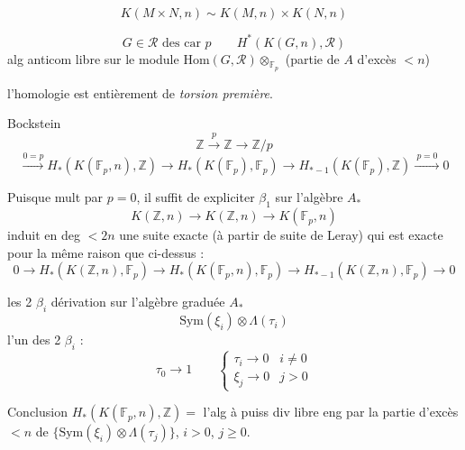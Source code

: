 \documentclass[11pt,a4paper]{article}
\begin{document}
\[
  K(M\times N,n) \sim K(M,n)\times K(N,n)
\]


\[
  G \in \mathcal{R} \text{ des car } p \qquad
  H^{\ast}(K(G,n),\mathcal{R})
\]
alg anticom libre sur le module $\mathrm{Hom}(G,\mathcal{R})\otimes_{\mathbb{F}_p}$ (partie de $A$ d'excès $<n$)

l'homologie est entièrement de \emph{torsion première}.

Bockstein
\[
  \mathbb{Z} \xrightarrow{\ p\ } \mathbb{Z} \to \mathbb{Z}/p
\]
\[
  \xrightarrow{0 = p} H_{\ast}(K(\mathbb{F}_p,n),\mathbb{Z}) \to H_{\ast}(K(\mathbb{F}_p),\mathbb{F}_p)
  \to H_{\ast-1}(K(\mathbb{F}_p),\mathbb{Z}) \xrightarrow{\ p=0\ } 0
\]

Puisque mult par $p = 0$, il suffit de \struck{\ill{}} expliciter $\beta_1$ sur l'algèbre $A_{\ast}$
\[
  K(\mathbb{Z},n) \to K(\mathbb{Z},n) \to K(\mathbb{F}_p,n)
\]
induit en deg $<2n$ une suite exacte (à partir de suite de Leray) qui est exacte pour la même raison que ci-dessus :
\[
  0 \to H_{\ast}(K(\mathbb{Z},n),\mathbb{F}_p) \to H_{\ast}(K(\mathbb{F}_p,n),\mathbb{F}_p)
  \to H_{\ast-1}(K(\mathbb{Z},n),\mathbb{F}_p) \to 0
\]

les 2 $\beta_i$   dérivation sur l'algèbre graduée $A_{\ast}$
\[
  \mathrm{Sym}(\xi_i)\otimes\Lambda(\tau_i)
\]
l'un des 2 $\beta_i$ :
\[
  \tau_0 \to 1 \qquad
  \begin{cases} \tau_i \to 0 & i\neq 0 \\ \xi_j \to 0 & j>0 \end{cases}
\]

Conclusion \quad $H_{\ast}(K(\mathbb{F}_p,n),\mathbb{Z}) = {}$  l'alg à puiss div libre eng par la partie d'excès $<n$ de $\{\mathrm{Sym}(\xi_i)\otimes\Lambda(\tau_j)\}$, $i>0$, $j\geq 0$.
\end{document}
